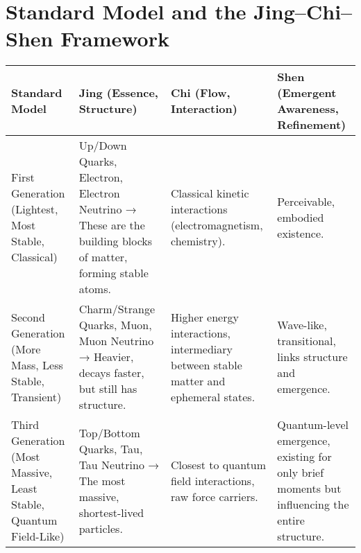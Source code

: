 \documentclass{article}
\begin{document}
\section*{Standard Model and the Jing–Chi–Shen Framework}

\renewcommand{\arraystretch}{1.5} %

\begin{tabular}{|p{3.8cm}|p{3.8cm}|p{3.8cm}|p{4.2cm}|}
\hline
\textbf{Standard Model} & \textbf{Jing (Essence, Structure)} & \textbf{Chi (Flow, Interaction)} & \textbf{Shen (Emergent Awareness, Refinement)} \\
\hline
First Generation (Lightest, Most Stable, Classical) & 
Up/Down Quarks, Electron, Electron Neutrino → These are the building blocks of matter, forming stable atoms. & 
Classical kinetic interactions (electromagnetism, chemistry). & 
Perceivable, embodied existence. \\
\hline
Second Generation (More Mass, Less Stable, Transient) & 
Charm/Strange Quarks, Muon, Muon Neutrino → Heavier, decays faster, but still has structure. & 
Higher energy interactions, intermediary between stable matter and ephemeral states. & 
Wave-like, transitional, links structure and emergence. \\
\hline
Third Generation (Most Massive, Least Stable, Quantum Field-Like) & 
Top/Bottom Quarks, Tau, Tau Neutrino → The most massive, shortest-lived particles. & 
Closest to quantum field interactions, raw force carriers. & 
Quantum-level emergence, existing for only brief moments but influencing the entire structure. \\
\hline
\end{tabular}
\end{document}
